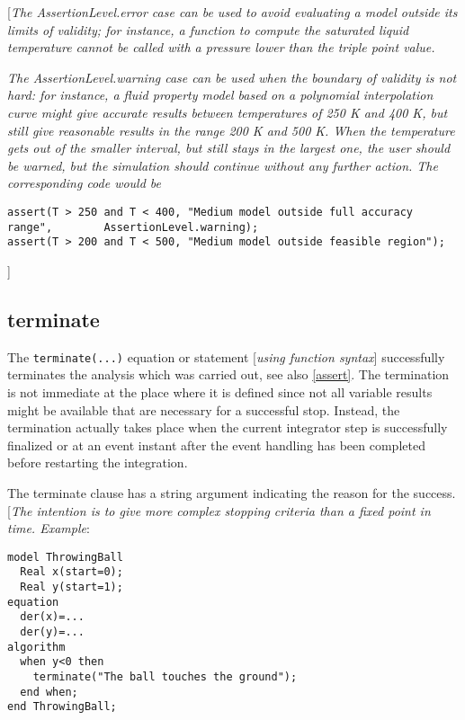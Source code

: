{[}\emph{The AssertionLevel.error case can be used to avoid evaluating a
model outside its limits of validity; for instance, a function to
compute the saturated liquid temperature cannot be called with a
pressure lower than the triple point value.}

\emph{The AssertionLevel.warning case can be used when the boundary of
validity is not hard: for instance, a fluid property model based on a
polynomial interpolation curve might give accurate results between
temperatures of 250 K and 400 K, but still give reasonable results in
the range 200 K and 500 K. When the temperature gets out of the smaller
interval, but still stays in the largest one, the user should be warned,
but the simulation should continue without any further action. The
corresponding code would be}

\begin{lstlisting}[language=modelica]
assert(T > 250 and T < 400, "Medium model outside full accuracy range",        AssertionLevel.warning);
assert(T > 200 and T < 500, "Medium model outside feasible region");
\end{lstlisting}
{]}

\subsection{terminate}

The \lstinline!terminate(...)! equation or statement {[}\emph{using function
syntax}{]} successfully terminates the analysis which was carried out,
see also \autoref{assert}. The termination is not immediate at the place
where it is defined since not all variable results might be available
that are necessary for a successful stop. Instead, the termination
actually takes place when the current integrator step is successfully
finalized or at an event instant after the event handling has been
completed before restarting the integration.

The terminate clause has a string argument indicating the reason for the
success. {[}\emph{The intention is to give more complex stopping
criteria than a fixed point in time. Example}:

\begin{lstlisting}[language=modelica]
model ThrowingBall
  Real x(start=0);
  Real y(start=1);
equation
  der(x)=...
  der(y)=...
algorithm
  when y<0 then
    terminate("The ball touches the ground");
  end when;
end ThrowingBall;
\end{lstlisting}

